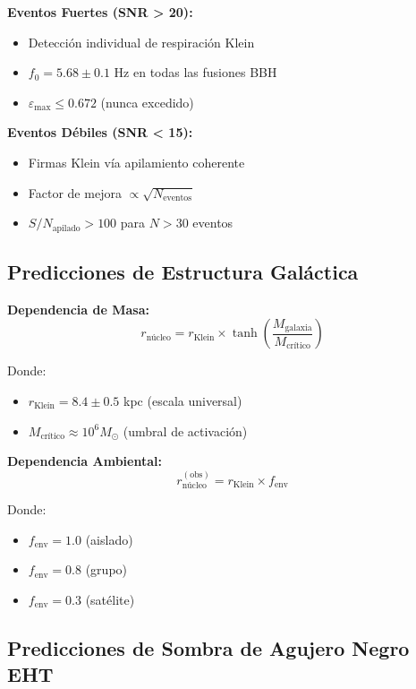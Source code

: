 \documentclass[12pt,a4paper]{article}
\begin{document}
\textbf{Eventos Fuertes (SNR > 20):}
\begin{itemize}
\item Detección individual de respiración Klein
\item $f_0 = 5.68 \pm 0.1$ Hz en todas las fusiones BBH
\item $\varepsilon_{\max} \leq 0.672$ (nunca excedido)
\end{itemize}

\textbf{Eventos Débiles (SNR < 15):}
\begin{itemize}
\item Firmas Klein vía apilamiento coherente
\item Factor de mejora $\propto \sqrt{N_{\text{eventos}}}$
\item $S/N_{\text{apilado}} > 100$ para $N > 30$ eventos
\end{itemize}

\subsection{Predicciones de Estructura Galáctica}

\textbf{Dependencia de Masa:}
\begin{equation}
r_{\text{núcleo}} = r_{\text{Klein}} \times \tanh\left(\frac{M_{\text{galaxia}}}{M_{\text{crítico}}}\right)
\end{equation}

Donde:
\begin{itemize}
\item $r_{\text{Klein}} = 8.4 \pm 0.5$ kpc (escala universal)
\item $M_{\text{crítico}} \approx 10^6 M_\odot$ (umbral de activación)
\end{itemize}

\textbf{Dependencia Ambiental:}
\begin{equation}
r_{\text{núcleo}}^{(\text{obs})} = r_{\text{Klein}} \times f_{\text{env}}
\end{equation}

Donde:
\begin{itemize}
\item $f_{\text{env}} = 1.0$ (aislado)
\item $f_{\text{env}} = 0.8$ (grupo)
\item $f_{\text{env}} = 0.3$ (satélite)
\end{itemize}

\subsection{Predicciones de Sombra de Agujero Negro EHT}
\end{document}
